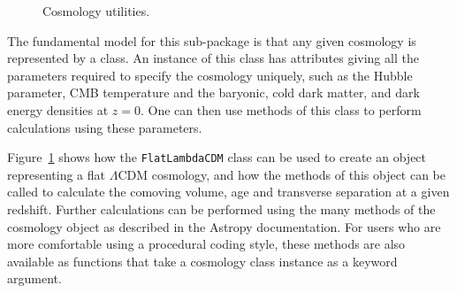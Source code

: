\documentclass[traditabstract]{aa}
\begin{document}
\begin{figure}
\center
\caption{Cosmology utilities.\label{code:cosmology}}
\vspace{0.1in}
\end{figure}

The fundamental model for this sub-package is that any given cosmology is
represented by a class. An instance of this class has attributes giving all the
parameters required to specify the cosmology uniquely, such as the Hubble
parameter, CMB temperature and the baryonic, cold dark matter, and dark energy
densities at $z=0$. One can then use methods of this class to perform
calculations using these parameters.

Figure~\ref{code:cosmology} shows how the \texttt{FlatLambdaCDM} class can be used to
create an object representing a flat $\Lambda$CDM cosmology, and how the
methods of this object can be called to calculate the comoving volume, age and
transverse separation at a given redshift. Further calculations can be performed using the
many methods of the cosmology object as described in the Astropy documentation.
For users who are more comfortable using a procedural coding style, these
methods are also available as functions that take a cosmology class instance as
a keyword argument.
\end{document}
